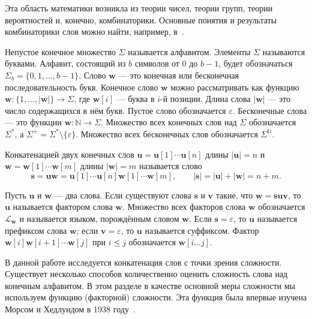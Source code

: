 \documentclass[a4paper,14pt]{extreport}
\theoremstyle{plain}
\theoremstyle{definition}
\theoremstyle{remark}
\begin{document}
Эта область математики возникла из теории чисел, теории групп, теории вероятностей и, конечно, комбинаторики. Основные понятия и результаты комбинаторики слов можно найти, например, в~\cite{Rigo}. 

Непустое конечное множество $\Sigma$ называется алфавитом. Элементы $\Sigma$ называются буквами. Алфавит, состоящий из $b$ символов от $0$ до $b-1$, будет обозначаться $\Sigma_{b} = \{0,1,\ldots,b-1\}$. Слово $\mathbf{w}$ --- это конечная или бесконечная последовательность букв. Конечное слово $\mathbf{w}$ можно рассматривать как функцию $\mathbf{w}\colon \{1,\ldots,|\mathbf{w}|\} \to \Sigma$, где $\mathbf{w}[i]$ --- буква в $i$-й позиции. Длина слова $|\mathbf{w}|$ --- это число содержащихся в нём букв. Пустое слово обозначается $\varepsilon$. Бесконечные слова --- это функции $\mathbf{w}\colon \mathbb{N} \to \Sigma$. Множество всех конечных слов над $\Sigma$ обозначается $\Sigma^*$, а $\Sigma^+ = \Sigma^* \setminus \{\varepsilon\}$. Множество всех бесконечных слов обозначается $\Sigma^{\mathbb{N}}$.

Конкатенацией двух конечных слов $\mathbf{u} = \mathbf{u}[1]\cdots\mathbf{u}[n]$ длины $|\mathbf{u}| = n$ и $\mathbf{w} = \mathbf{w}[1]\cdots\mathbf{w}[m]$ длины $|\mathbf{w}| = m$ называется слово
\begin{equation}
	\mathbf{s} = \mathbf{u}\mathbf{w} = \mathbf{u}[1]\cdots\mathbf{u}[n]\mathbf{w}[1]\cdots\mathbf{w}[m], 
	\qquad |\mathbf{s}| = |\mathbf{u}| + |\mathbf{w}| = n + m.
\end{equation}

Пусть $\mathbf{u}$ и $\mathbf{w}$ --- два слова. Если существуют слова $\mathbf{s}$ и $\mathbf{v}$ такие, что $\mathbf{w} = \mathbf{s}\mathbf{u}\mathbf{v}$, то $\mathbf{u}$ называется фактором слова $\mathbf{w}$. Множество всех факторов слова $\mathbf{w}$ обозначается $\mathcal{L}_{\mathbf{w}}$ и называется языком, порождённым словом $\mathbf{w}$. Если $\mathbf{s} = \varepsilon$, то $\mathbf{u}$ называется префиксом слова $\mathbf{w}$; если $\mathbf{v} = \varepsilon$, то $\mathbf{u}$ называется суффиксом. Фактор $\mathbf{w}[i]\mathbf{w}[i+1]\cdots\mathbf{w}[j]$ при $i \leq j$ обозначается $\mathbf{w}[i\ldots j]$.

В данной работе исследуется конкатенация слов с точки зрения сложности. Существует несколько способов количественно оценить сложность слова над конечным алфавитом. В этом разделе в качестве основной меры сложности мы используем функцию (факторной) сложности. Эта функция была впервые изучена Морсом и Хедлундом в 1938 году~\cite{Morse}. 
\end{document}
